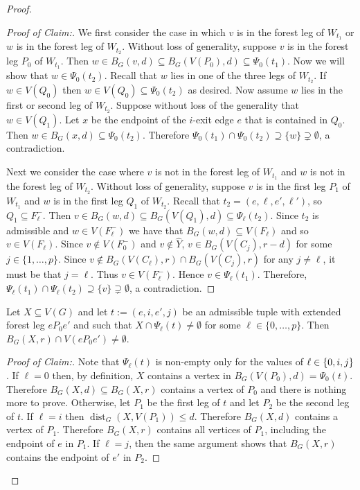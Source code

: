 \documentclass{patmorin}
\newcommand{\pat}[1]{\textcolor{Blue}{[Pat: #1]}}
\newcommand{\gwen}[1]{\textcolor{Purple}{Gwen: #1}}
\newenvironment{clmproof}{\begin{proof}[Proof of Claim:]\renewcommand{\qedsymbol}{\rule{1ex}{1ex}}}{\end{proof}}
\DeclareMathOperator{\dist}{dist}
\DeclarePairedDelimiter\set{\{}{\}}
\begin{document}
\begin{proof}
\begin{clmproof}
  We first consider the case in which $v$ is in the forest leg of $W_{t_1}$ or $w$ is in the forest leg of $W_{t_2}$.   Without loss of generality, suppose $v$ is in the forest leg $P_0$ of $W_{t_1}$. 
  Then $w\in B_G(v,d)\subseteq B_G(V(P_0),d)\subseteq\Psi_0(t_1)$.  Now we will show that $w\in \Psi_0(t_2)$.   Recall that $w$ lies in one of the three legs of $W_{t_2}$. 
  If $w\in V(Q_0)$ then $w\in V(Q_0)\subseteq \Psi_0(t_2)$ as desired. 
  Now assume $w$ lies in the first or second leg of $W_{t_2}$.
  Suppose without loss of the generality that $w\in V(Q_1)$. 
  Let $x$ be the endpoint of the $i$-exit edge $e$ that is contained in $Q_0$.
  Then $w\in B_G(x,d)\subseteq\Psi_0(t_2)$.
  Therefore $\Psi_0(t_1)\cap\Psi_0(t_2)\supseteq\{w\}\supsetneq\emptyset$, a contradiction. 

  Next we consider the case where $v$ is not in the forest leg of $W_{t_1}$ and $w$ is not in the forest leg of $W_{t_2}$.  Without loss of generality, suppose $v$ is in the first leg $P_1$ of $W_{t_1}$ and $w$ is in the first leg $Q_1$ of $W_{t_2}$. 
  Recall that $t_2=(e,\ell,e',\ell')$, so $Q_1\subseteq F_\ell^-$. 
  Then $v\in B_G(w,d)\subseteq B_G(V(Q_1),d) \subseteq \Psi_\ell(t_2)$.  
  Since $t_2$ is admissible and $w\in V(F^-_\ell)$ we have that $B_G(w,d) \subseteq V(F_\ell)$ and so $v\in V(F_\ell)$. 
  Since $v\not\in V(F_0^-)$ and $v\not\in \widehat{Y}$, 
  $v\in B_G(V(C_j),r-d)$ for some $j\in\{1,\ldots,p\}$. 
  Since $v\notin B_G(V(C_\ell),r)\cap B_G(V(C_j),r)$ for any $j\neq \ell$, it must be that $j=\ell$. Thus $v\in V(F^-_\ell)$.  Hence $v\in\Psi_\ell(t_1)$.
  Therefore, $\Psi_\ell(t_1)\cap\Psi_\ell(t_2)\supseteq\{v\}\supsetneq \emptyset$, a contradiction. 
\end{clmproof}


\begin{clm}\label{hungarians_hit}
  Let $X\subseteq V(G)$ and let $t:=(e,i,e',j)$ be an admissible tuple with extended forest leg $eP_0e'$ and such that $X\cap \Psi_\ell(t)\neq\emptyset$ for some $\ell\in\{0,\ldots,p\}$.  Then $B_G(X,r)\cap V(eP_0e')\neq\emptyset$.
\end{clm}

\begin{clmproof}
  Note that $\Psi_{\ell}(t)$ is non-empty only for the values of $\ell\in\set{0,i,j}$. 
  If $\ell=0$ then, by definition, $X$ contains a vertex in $B_G(V(P_0),d)=\Psi_0(t)$.  Therefore $B_G(X,d)\subseteq B_G(X,r)$ contains a vertex of $P_0$ and there is nothing more to prove.
  Otherwise, let $P_1$ be the first leg of $t$ and let $P_2$ be the second leg of $t$.
  If $\ell=i$ then $\dist_G(X,V(P_1))\le d$.  Therefore $B_G(X,d)$ contains a vertex of $P_1$.  Therefore $B_G(X,r)$ contains all vertices of $P_1$, including the endpoint of $e$ in $P_1$.  If $\ell=j$, then the same argument shows that $B_G(X,r)$ contains the endpoint of $e'$ in $P_2$.
\end{clmproof}


\end{proof}
\end{document}
